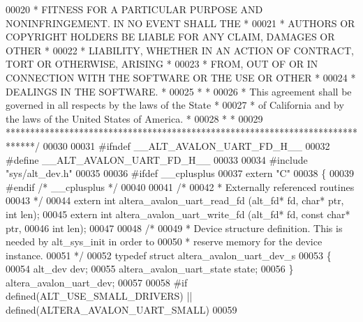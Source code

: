 \begin{DoxyCode}
00020 \textcolor{comment}{* FITNESS FOR A PARTICULAR PURPOSE AND NONINFRINGEMENT. IN NO EVENT SHALL THE *}
00021 \textcolor{comment}{* AUTHORS OR COPYRIGHT HOLDERS BE LIABLE FOR ANY CLAIM, DAMAGES OR OTHER      *}
00022 \textcolor{comment}{* LIABILITY, WHETHER IN AN ACTION OF CONTRACT, TORT OR OTHERWISE, ARISING     *}
00023 \textcolor{comment}{* FROM, OUT OF OR IN CONNECTION WITH THE SOFTWARE OR THE USE OR OTHER         *}
00024 \textcolor{comment}{* DEALINGS IN THE SOFTWARE.                                                   *}
00025 \textcolor{comment}{*                                                                             *}
00026 \textcolor{comment}{* This agreement shall be governed in all respects by the laws of the State   *}
00027 \textcolor{comment}{* of California and by the laws of the United States of America.              *}
00028 \textcolor{comment}{*                                                                             *}
00029 \textcolor{comment}{******************************************************************************/}
00030 
00031 \textcolor{preprocessor}{#ifndef \_\_ALT\_AVALON\_UART\_FD\_H\_\_}
00032 \textcolor{preprocessor}{#define \_\_ALT\_AVALON\_UART\_FD\_H\_\_}
00033 
00034 \textcolor{preprocessor}{#include "sys/alt_dev.h"}
00035 
00036 \textcolor{preprocessor}{#ifdef \_\_cplusplus}
00037 \textcolor{keyword}{extern} \textcolor{stringliteral}{"C"}
00038 \{
00039 \textcolor{preprocessor}{#endif }\textcolor{comment}{/* \_\_cplusplus */}\textcolor{preprocessor}{}
00040 
00041 \textcolor{comment}{/*}
00042 \textcolor{comment}{ * Externally referenced routines}
00043 \textcolor{comment}{ */}
00044 \textcolor{keyword}{extern} \textcolor{keywordtype}{int} altera_avalon_uart_read_fd (alt_fd* fd, \textcolor{keywordtype}{char}* ptr, \textcolor{keywordtype}{int} len);
00045 \textcolor{keyword}{extern} \textcolor{keywordtype}{int} altera_avalon_uart_write_fd (alt_fd* fd, \textcolor{keyword}{const} \textcolor{keywordtype}{char}* ptr,
00046   \textcolor{keywordtype}{int} len);
00047 
00048 \textcolor{comment}{/*}
00049 \textcolor{comment}{ * Device structure definition. This is needed by alt\_sys\_init in order to }
00050 \textcolor{comment}{ * reserve memory for the device instance.}
00051 \textcolor{comment}{ */}
00052 \textcolor{keyword}{typedef} \textcolor{keyword}{struct }altera_avalon_uart_dev_s
00053 \{
00054   alt_dev        dev;
00055   altera_avalon_uart_state state;
00056 \} altera_avalon_uart_dev;
00057 
00058 \textcolor{preprocessor}{#if defined(ALT\_USE\_SMALL\_DRIVERS) || defined(ALTERA\_AVALON\_UART\_SMALL)}
00059 

\end{DoxyCode}
